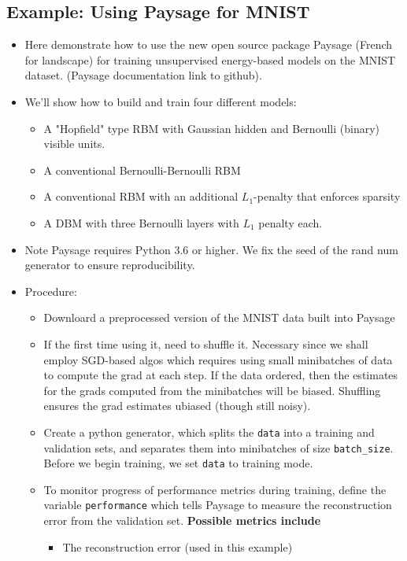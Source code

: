 \documentclass[norsk,a4paper,11pt]{article}
\begin{document}
\subsection{Example: Using Paysage for MNIST}
\begin{itemize}
	\item Here demonstrate how to use the new open source package Paysage (French for landscape) for training unsupervised energy-based models on the MNIST dataset. (Paysage documentation link to github).
	\item We'll show how to build and train four different models:
	\begin{itemize}
		\item  A "Hopfield" type RBM with Gaussian hidden and Bernoulli (binary) visible units.
		\item A conventional Bernoulli-Bernoulli RBM
		\item A conventional RBM with an additional $L_1$-penalty that enforces sparsity
		\item A DBM with three Bernoulli layers with $L_1$ penalty each.
	\end{itemize}
	\item Note Paysage requires Python 3.6 or higher. We fix the seed of the rand num generator to ensure reproducibility.
	\item Procedure:
	\begin{itemize}
		\item Downloard a preprocessed version of the MNIST data built into Paysage
		\item If the first time using it, need to shuffle it. Necessary since we shall employ SGD-based algos which requires using small minibatches of data to compute the grad at each step. If the data ordered, then the estimates for the grads computed from the minibatches will be biased. Shuffling ensures the grad estimates ubiased (though still noisy).
		\item Create a python generator, which splits the \texttt{data} into a training and validation sets, and separates them into minibatches of size \texttt{batch\_size}. Before we begin training, we set \texttt{data} to training mode.
		\item To monitor progress of performance metrics during training, define the variable \texttt{performance} which tells Paysage to measure the reconstruction error from the validation set. \textbf{Possible metrics include}
		\begin{itemize} 
			\item The reconstruction error (used in this example)

\end{itemize}
\end{itemize}
\end{itemize}
\end{document}
